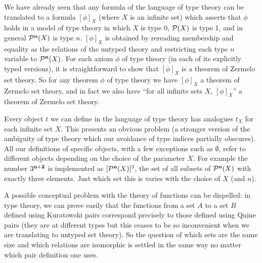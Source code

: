 \documentclass[12pt]{book}
\begin{document}
We have already seen that any formula of the language of type theory
can be translated to a formula $[\phi]_X$ (where $X$ is an infinite set)
which asserts that $\phi$ holds in a model of type theory in which $X$
is type 0, ${\cal P}(X)$ is type 1, and in general ${\cal P}^{\bf n}(X)$ is
type $n$.  $[\phi]_X$ is obtained by rereading membership and equality
as the relations of the untyped theory and restricting each type $n$
variable to ${\cal P}^{\bf n}(X)$.  For each axiom $\phi$ of type theory (in
each of its explicitly typed versions), it is straightforward to show
that $[\phi]_X$ is a theorem of Zermelo set theory.  So for any theorem
$\phi$ of type theory we have $[\phi]_X$ a theorem of Zermelo set
theory, and in fact we also have ``for all infinite sets $X$,
$[\phi]_X$'' a theorem of Zermelo set theory. 

Every object $t$ we can define in the language of type theory has
analogues $t_X$ for each infinite set $X$.  This presents an obvious
problem (a stronger version of the ambiguity of type theory which our
avoidance of type indices partially obscures).  All our definitions of
specific objects, with a few exceptions such as $\emptyset$, refer to
different objects depending on the choice of the parameter $X$.  For
example the number $3^{\bf n+2}$ is implemented as $[{\cal P}^{\bf n}(X)]^3$,
the set of all subsets of ${\cal P}^{\bf n}(X)$ with exactly three elements.
Just which set this is varies with the choice of $X$ (and $n$).

A possible conceptual problem with the theory of functions can be
dispelled: in type theory, we can prove easily that the functions from
a set $A$ to a set $B$ defined using Kuratowski pairs correspond
precisely to those defined using Quine pairs (they are at different
types but this ceases to be so inconvenient when we are translating to
untyped set theory).  So the question of which sets are the same size
and which relations are isomorphic is settled in the same way no
matter which pair definition one uses.
\end{document}
